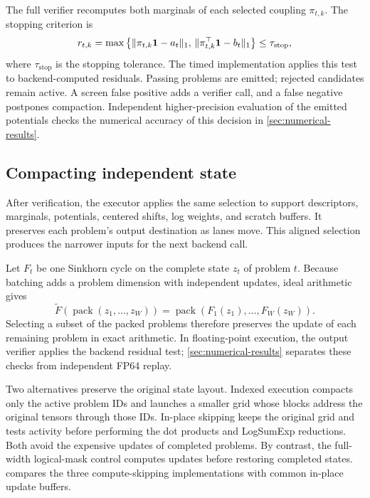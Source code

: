 The full verifier recomputes both marginals of each selected coupling $\pi_{t,k}$. The stopping criterion is
\begin{equation}
r_{t,k}=\max\left\{
\|\pi_{t,k}\mathbf{1}-a_t\|_1,\,
\|\pi_{t,k}^\top\mathbf{1}-b_t\|_1
\right\}\leq\tau_{\mathrm{stop}},
\label{eq:release-contract}
\end{equation}
where $\tau_{\mathrm{stop}}$ is the stopping tolerance. The timed implementation applies this test to backend-computed residuals. Passing problems are emitted; rejected candidates remain active. A screen false positive adds a verifier call, and a false negative postpones compaction. Independent higher-precision evaluation of the emitted potentials checks the numerical accuracy of this decision in \cref{sec:numerical-results}.

\subsection{Compacting independent state}

After verification, the executor applies the same selection to support descriptors, marginals, potentials, centered shifts, log weights, and scratch buffers. It preserves each problem's output destination as lanes move. This aligned selection produces the narrower inputs for the next backend call.

Let $F_t$ be one Sinkhorn cycle on the complete state $z_t$ of problem $t$. Because batching adds a problem dimension with independent updates, ideal arithmetic gives
\begin{equation}
\widetilde F\!\left(\operatorname{pack}(z_1,\ldots,z_W)\right)
=\operatorname{pack}\!\left(F_1(z_1),\ldots,F_W(z_W)\right).
\label{eq:pack-commutes}
\end{equation}
Selecting a subset of the packed problems therefore preserves the update of each remaining problem in exact arithmetic. In floating-point execution, the output verifier applies the backend residual test; \cref{sec:numerical-results} separates these checks from independent FP64 replay.

Two alternatives preserve the original state layout. Indexed execution compacts only the active problem IDs and launches a smaller grid whose blocks address the original tensors through those IDs. In-place skipping keeps the original grid and tests activity before performing the dot products and LogSumExp reductions. Both avoid the expensive updates of completed problems. By contrast, the full-width logical-mask control computes updates before restoring completed states.  compares the three compute-skipping implementations with common in-place update buffers.

